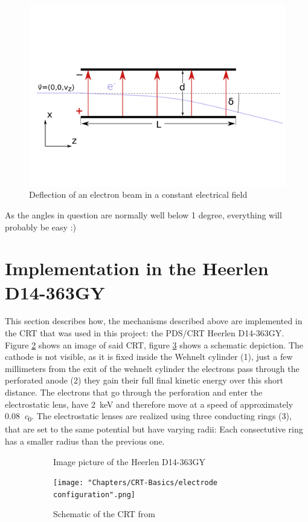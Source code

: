 \begin{figure}
	\centering
	\includegraphics[width=0.7\linewidth]{Chapters/CRT-Basics/DeflectionPlate2}
	\caption{Deflection of an electron beam in a constant electrical field}
	\label{fig:deflectionplate2}
\end{figure}


As the angles in question are normally well below 1 degree, everything will probably be easy :) 

\section{Implementation in the Heerlen D14-363GY }

This section describes how, the mechanisms described above are implemented in the CRT that was used in this project: the PDS/CRT Heerlen D14-363GY. Figure \ref{fig:FotoCRT}  shows an image of said CRT, figure \ref{fig:SchemeCRT} shows a schematic depiction. The cathode is not visible, as it is fixed inside the Wehnelt cylinder (1), just a few millimeters from the exit of the wehnelt cylinder the electrons pass through the perforated anode (2) they gain their full final kinetic energy over this short distance. The electrons that go through the perforation and enter the electrostatic lens, have \SI{2}{\kilo\electronvolt} and therefore move at a speed of approximately \SI{0.08}{\clight}. 
The electrostatic lenses are realized using three conducting rings (3), that are set to the same potential but have varying radii: Each consectutive ring has a smaller radius than the previous one. 

\begin{figure}
	\centering
	\begin{subfigure}{.5\textwidth}
		\centering
		\caption{Image picture of the Heerlen D14-363GY}
		\label{fig:FotoCRT}
	\end{subfigure}%
	\begin{subfigure}{.5\textwidth}
		\centering
		\texttt{[image: "Chapters/CRT-Basics/electrode configuration".png]}
		\caption{Schematic of the CRT from \cite{D14363GY123-manual}}
		\label{fig:SchemeCRT}
	\end{subfigure}
	\caption{}
	\label{}
\end{figure}



